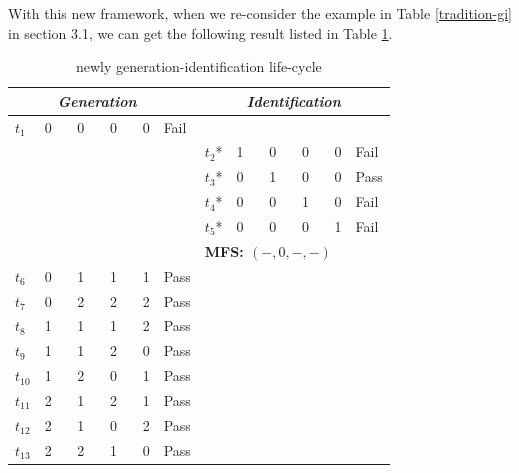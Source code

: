 \documentclass{sig-alternate}
\begin{document}
With this new framework, when we re-consider the example in Table \ref{tradition-gi} in section 3.1,  we can get the following result listed in Table \ref{new-gi}.
\begin{table}[h]
\caption{newly generation-identification life-cycle}
\label{new-gi}
\center
\begin{tabular}{llllll|llllll}
\hline
 & \multicolumn{4}{c}{\bfseries \emph{Generation}}& & \multicolumn{6}{c}{\bfseries \emph{Identification}} \\
 \hline
$t_{1}$ & \multicolumn{4}{l}{0 \ \ \ 0 \ \ \ 0  \ \ \  0 } & Fail & \multicolumn{6}{l}{}\\
\multicolumn{5}{l}{}& & $t_{2}$* &\multicolumn{4}{l}{1  \ \ \  0 \ \ \  0 \ \ \  0 }& Fail \\
\multicolumn{5}{l}{}& &$t_{3}$* &\multicolumn{4}{l}{0  \ \ \   1 \ \ \  0 \ \ \  0} & Pass \\
\multicolumn{5}{l}{}& &$t_{4}$* &\multicolumn{4}{l}{0  \ \ \   0 \ \ \   1 \ \ \  0} & Fail \\
\multicolumn{5}{l}{}& &$t_{5}$* &\multicolumn{4}{l}{0  \ \ \   0 \ \ \   0 \ \ \   1} & Fail \\
\multicolumn{5}{l}{}& &\multicolumn{6}{l}{ \bfseries{MFS}: $(-, 0, - , -)$ }  \\
$t_{6}$ &\multicolumn{4}{l}{0 \ \ \ 1 \ \ \ 1  \ \ \  1 } & Pass & \multicolumn{6}{l}{}\\
$t_{7}$ &\multicolumn{4}{l}{0 \ \ \ 2 \ \ \ 2  \ \ \  2 } & Pass & \multicolumn{6}{l}{}\\
$t_{8}$ &\multicolumn{4}{l}{1  \ \ \ 1 \ \ \ 1  \ \ \  2 } & Pass & \multicolumn{6}{l}{}\\
$t_{9}$ &\multicolumn{4}{l}{1  \ \ \  1 \ \ \ 2 \ \ \ 0 } & Pass & \multicolumn{6}{l}{}\\
$t_{10}$ &\multicolumn{4}{l}{1  \ \ \   2 \ \ \   0 \ \ \ 1} & Pass & \multicolumn{6}{l}{}\\
$t_{11}$ &\multicolumn{4}{l}{2  \ \ \   1 \ \ \ 2  \ \ \  1 } & Pass & \multicolumn{6}{l}{}\\
$t_{12}$ &\multicolumn{4}{l}{2  \ \ \   1 \ \ \ 0  \ \ \  2 } & Pass & \multicolumn{6}{l}{}\\
$t_{13}$ &\multicolumn{4}{l}{2  \ \ \   2 \ \ \ 1  \ \ \  0 } & Pass & \multicolumn{6}{l}{}\\
\hline
\end{tabular}
\end{table}
\end{document}
